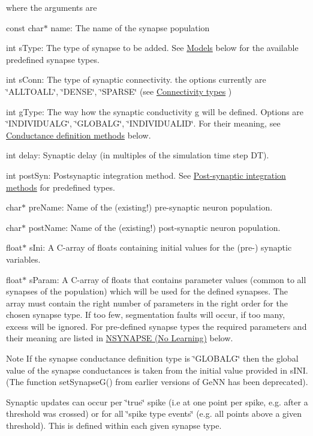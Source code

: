  where the arguments are \begin{DoxyItemize}
\item {\ttfamily const} {\ttfamily char$\ast$} name\+: The name of the synapse population \item {\ttfamily int} {\ttfamily s\+Type\+:} The type of synapse to be added. See \hyperlink{sect3_subsect31}{Models} below for the available predefined synapse types. \item {\ttfamily int} {\ttfamily s\+Conn\+:} The type of synaptic connectivity. the options currently are \char`\"{}\+A\+L\+L\+T\+O\+A\+L\+L\char`\"{}, \char`\"{}\+D\+E\+N\+S\+E\char`\"{}, \char`\"{}\+S\+P\+A\+R\+S\+E\char`\"{} (see \hyperlink{sect3_subsect32}{Connectivity types} ) \item {\ttfamily int} {\ttfamily g\+Type\+:} The way how the synaptic conductivity g will be defined. Options are \char`\"{}\+I\+N\+D\+I\+V\+I\+D\+U\+A\+L\+G\char`\"{}, \char`\"{}\+G\+L\+O\+B\+A\+L\+G\char`\"{}, \char`\"{}\+I\+N\+D\+I\+V\+I\+D\+U\+A\+L\+I\+D\char`\"{}. For their meaning, see \hyperlink{sect3_subsect33}{Conductance definition methods} below. \item {\ttfamily int} {\ttfamily delay\+:} Synaptic delay (in multiples of the simulation time step {\ttfamily D\+T}). \item {\ttfamily int} {\ttfamily post\+Syn\+:} Postsynaptic integration method. See \hyperlink{sect_postsyn}{Post-\/synaptic integration methods} for predefined types. \item {\ttfamily char$\ast$} {\ttfamily pre\+Name\+:} Name of the (existing!) pre-\/synaptic neuron population. \item {\ttfamily char$\ast$} {\ttfamily post\+Name\+:} Name of the (existing!) post-\/synaptic neuron population. \item {\ttfamily float$\ast$} {\ttfamily s\+Ini\+:} A C-\/array of floats containing initial values for the (pre-\/) synaptic variables. \item {\ttfamily float$\ast$} {\ttfamily s\+Param\+:} A C-\/array of floats that contains parameter values (common to all synapses of the population) which will be used for the defined synapses. The array must contain the right number of parameters in the right order for the chosen synapse type. If too few, segmentation faults will occur, if too many, excess will be ignored. For pre-\/defined synapse types the required parameters and their meaning are listed in \hyperlink{sect3_sect31}{N\+S\+Y\+N\+A\+P\+S\+E (No Learning)} below.\end{DoxyItemize}
\begin{DoxyNote}{Note}
If the synapse conductance definition type is \char`\"{}\+G\+L\+O\+B\+A\+L\+G\char`\"{} then the global value of the synapse conductances is taken from the initial value provided in {\ttfamily s\+I\+N\+I}. (The function set\+Synapse\+G() from earlier versions of Ge\+N\+N has been deprecated).
\end{DoxyNote}
Synaptic updates can occur per \char`\"{}true\char`\"{} spike (i.\+e at one point per spike, e.\+g. after a threshold was crossed) or for all \char`\"{}spike type events\char`\"{} (e.\+g. all points above a given threshold). This is defined within each given synapse type.

